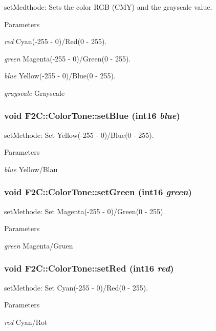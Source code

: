 setMedthode: Sets the color RGB (CMY) and the grayscale value. 
\begin{DoxyParams}{Parameters}
\item[{\em red}]Cyan(-\/255 -\/ 0)/Red(0 -\/ 255). \item[{\em green}]Magenta(-\/255 -\/ 0)/Green(0 -\/ 255). \item[{\em blue}]Yellow(-\/255 -\/ 0)/Blue(0 -\/ 255). \item[{\em grayscale}]Grayscale \end{DoxyParams}
\hypertarget{class_f2_c_1_1_color_tone_a6fb186c7fd68c103669f12ba4ee1fb00}{
\subsubsection[{setBlue}]{\setlength{\rightskip}{0pt plus 5cm}void F2C::ColorTone::setBlue ({\bf int16} {\em blue})}}
\label{class_f2_c_1_1_color_tone_a6fb186c7fd68c103669f12ba4ee1fb00}


setMethode: Set Yellow(-\/255 -\/ 0)/Blue(0 -\/ 255). 
\begin{DoxyParams}{Parameters}
\item[{\em blue}]Yellow/Blau \end{DoxyParams}
\hypertarget{class_f2_c_1_1_color_tone_a184ce7d0ea7b172138dea5fc6e5a1cdf}{
\subsubsection[{setGreen}]{\setlength{\rightskip}{0pt plus 5cm}void F2C::ColorTone::setGreen ({\bf int16} {\em green})}}
\label{class_f2_c_1_1_color_tone_a184ce7d0ea7b172138dea5fc6e5a1cdf}


setMethode: Set Magenta(-\/255 -\/ 0)/Green(0 -\/ 255). 
\begin{DoxyParams}{Parameters}
\item[{\em green}]Magenta/Gruen \end{DoxyParams}
\hypertarget{class_f2_c_1_1_color_tone_a269d5e83e4db3636641a72cd65763589}{
\subsubsection[{setRed}]{\setlength{\rightskip}{0pt plus 5cm}void F2C::ColorTone::setRed ({\bf int16} {\em red})}}
\label{class_f2_c_1_1_color_tone_a269d5e83e4db3636641a72cd65763589}


setMethode: Set Cyan(-\/255 -\/ 0)/Red(0 -\/ 255). 
\begin{DoxyParams}{Parameters}
\item[{\em red}]Cyan/Rot \end{DoxyParams}

